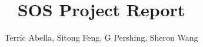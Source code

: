 \documentclass{article}
\title{SOS Project Report}
\author{Terric Abella, Sitong Feng, G Pershing, Sheron Wang}
\begin{document}
	
	\maketitle
	
	\tableofcontents \pagebreak
	
	 \pagebreak
	
	 \pagebreak
	
	 \pagebreak
	
	 \pagebreak
    
     \pagebreak
    
     \pagebreak
    
     \pagebreak

     \pagebreak
    
    
	
\end{document}
